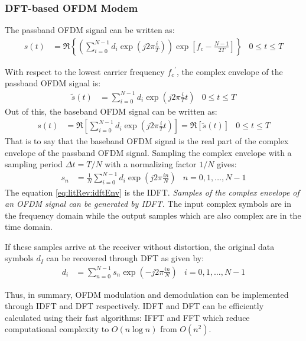 \subsubsection{DFT-based OFDM Modem}
The passband OFDM signal can be written as:
\begin{align*}
	s(t) &= \Re \left\{ \left( \sum_{i=0}^{N-1} d_i \exp (j2\pi \frac{i}{T}) \right) \exp \left[f_c - \frac{N-1}{2T} \right] \right\} & 0 \leq t \leq T
\end{align*}
\begin{mathDef}
\end{mathDef}
With respect to the lowest carrier frequency \({f_c}^\prime\), the complex envelope of the passband OFDM signal is:
\begin{align*}
	\tilde{s}(t) &= \sum_{i=0}^{N-1} d_i \exp (j2\pi\frac{i}{T}t) & 0 \leq t \leq T
\end{align*}
Out of this, the baseband OFDM signal can be written as:
\begin{align*}
	s(t) &= \Re \left[ \sum_{i=0}^{N-1} d_i \exp (j2\pi\frac{i}{T}t) \right] = \Re [\tilde{s}(t)] & 0 \leq t \leq T
\end{align*}
That is to say that the baseband OFDM signal is the real part of the complex envelope of the passband OFDM signal. Sampling the complex envelope with a sampling period \(\Delta t = T/N\) with a normalizing factor \(1/N\) gives:
\begin{align}
	s_n &= \frac{1}{N} \sum_{i=0}^{N-1} d_i \exp \left( j2\pi \frac{in}{N} \right) & n = 0,1,\ldots,N-1
	\label{eq:litRev:idftEnv}
\end{align}
The equation \eqref{eq:litRev:idftEnv} is the \gls{IDFT}. \emph{Samples of the complex envelope of an OFDM signal can be generated by \gls{IDFT}\cite{fuqin}.} The input complex symbols are in the frequency domain while the output samples which are also complex are in the time domain.

If these samples arrive at the receiver without distortion, the original data symbols \(d_I\) can be recovered through \gls{DFT} as given by:
\begin{align*}
	d_i &= \sum_{n=0}^{N-1} s_n \exp \left(-j2\pi\frac{in}{N}\right) & i = 0,1,\ldots,N-1
\end{align*}

Thus, in summary, OFDM modulation and demodulation can be implemented through \gls{IDFT} and \gls{DFT} respectively. \gls{IDFT} and \gls{DFT} can be efficiently calculated using their fast algorithms: \gls{IFFT} and \gls{FFT} which reduce computational complexity to \(O(n\log n)\) from \(O(n^2)\).

